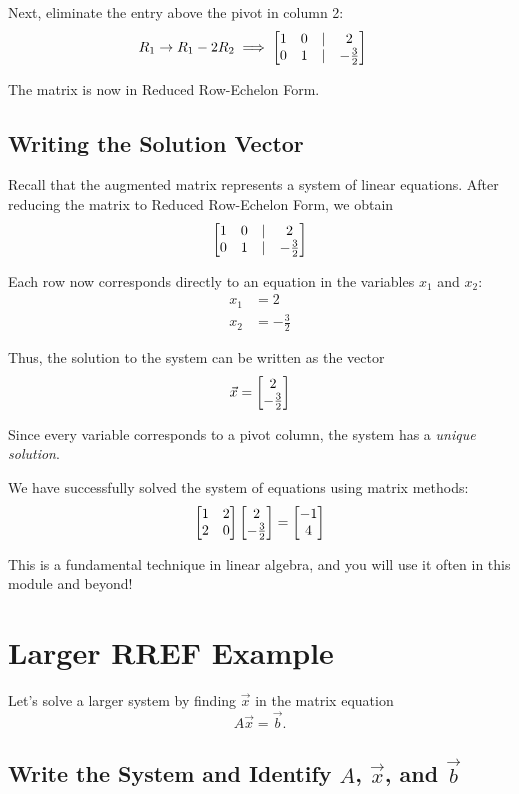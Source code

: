 Next, eliminate the entry above the pivot in column 2:
\begin{align*}
R_1 \rightarrow R_1 - 2R_2 
&\implies 
\begin{bmatrix} 1 & 0 &\vert & 2 \\ 0 & 1 & \vert & -\frac{3}{2} \end{bmatrix}
\end{align*}

The matrix is now in Reduced Row-Echelon Form.

\subsection{Writing the Solution Vector}

Recall that the augmented matrix represents a system of linear equations. After reducing the matrix to Reduced Row-Echelon Form, we obtain
\begin{align*}
\begin{bmatrix} 1 & 0 &\vert & 2 \\ 0 & 1 & \vert & -\frac{3}{2} \end{bmatrix}
\end{align*}

Each row now corresponds directly to an equation in the variables $x_1$ and $x_2$:
\begin{align*}
x_1 &= 2 \\
x_2 &= -\frac{3}{2}
\end{align*}

Thus, the solution to the system can be written as the vector
\[
\vec{x}
=
\begin{bmatrix} 2 \\-\frac{3}{2} \end{bmatrix}
\]

Since every variable corresponds to a pivot column, the system has a \emph{unique solution}.

We have successfully solved the system of equations using matrix methods:
$$\begin{bmatrix} 1 & 2 \\ 2 & 0 \end{bmatrix}\begin{bmatrix} 2 \\ -\frac{3}{2} \end{bmatrix} = \begin{bmatrix} -1 \\ 4 \end{bmatrix}$$

This is a fundamental technique in linear algebra, and you will use it often in this module and beyond!

\section{Larger RREF Example}

Let's solve a larger system by finding $\vec{x}$ in the matrix equation
\[
A\vec{x}=\vec{b}.
\]

\subsection{Write the System and Identify $A$, $\vec{x}$, and $\vec{b}$}

